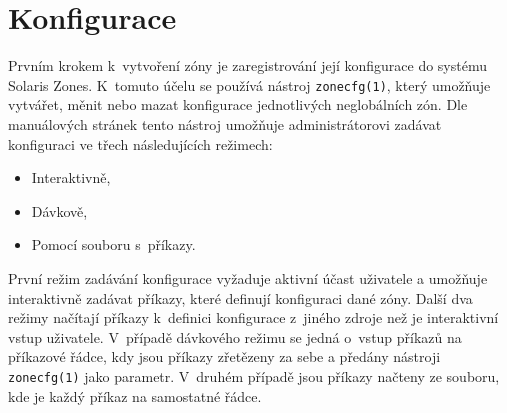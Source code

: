\section{Konfigurace}
\label{chapter:zones:configuration}
Prvním krokem k~vytvoření zóny je zaregistrování její konfigurace do systému Solaris Zones. K~tomuto účelu se používá nástroj
\verb|zonecfg(1)|, který umožňuje vytvářet, měnit nebo mazat konfigurace jednotlivých neglobálních zón. Dle manuálových stránek 
\cite{oracle:manpages:zonecfg} tento nástroj umožňuje administrátorovi zadávat konfiguraci ve třech následujících režimech:
\begin{itemize}
 \item Interaktivně,
 \item Dávkově,
 \item Pomocí souboru s~příkazy.
\end{itemize}
První režim zadávání konfigurace vyžaduje aktivní účast uživatele a umožňuje interaktivně zadávat příkazy, které definují
konfiguraci dané zóny. Další dva režimy načítají příkazy k~definici konfigurace z~jiného zdroje než je interaktivní vstup uživatele.
V~případě dávkového režimu se jedná o~vstup příkazů na příkazové řádce, kdy jsou příkazy zřetězeny za sebe a předány nástroji
\verb|zonecfg(1)| jako parametr. V~druhém případě jsou příkazy načteny ze souboru, kde je každý příkaz na samostatné řádce.

